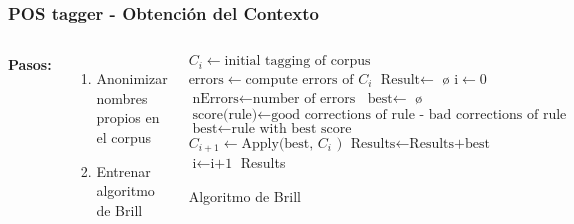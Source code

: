 \documentclass{beamer}
\begin{document}
\begin{frame}[fragile]
\frametitle{POS tagger - Obtención del Contexto}
\begin{columns}[t] %
\textbf{Pasos:}
\begin{enumerate}
\item Anonimizar nombres propios en el corpus
\item Entrenar algoritmo de Brill
\end{enumerate}
\begin{algorithm}[H]
    \begin{algorithmic}[1]
    \algrenewcommand{}
    \State $\text{$C_{i}$} \gets \text{initial tagging of corpus}$
\State $\text{errors} \gets \text{compute errors of $C_{i}$}$
\State $\text{Result} \gets$ \o
\State $\text{i} \gets 0$
\State $\text{nErrors} \gets \text{number of errors}$
\State $\text{best}  \gets$ \o
{} 
            \State $\text{score(rule)} \gets \text{good corrections of rule - bad corrections of rule}$ 
            \EndFor
        \EndFor
        \State $\text{best} \gets \text{rule with best score}$
		\State $\text{$C_{i+1}$} \gets \text{Apply(best, $C_{i}$ )}$
		\State $\text{Results} \gets \text{Results+best}$
		\State $\text{i} \gets \text{i+1}$
        \EndWhile
        \EndProcedure
        \State \Return Results
    \end{algorithmic}
    \label{alg:rAP}
    \caption{Algoritmo de Brill}
\end{algorithm}
\end{columns}
\end{frame}
\end{document}
